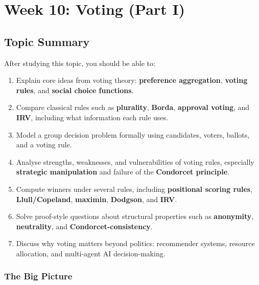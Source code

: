 \section{Week 10: Voting (Part I)}

\subsection{Topic Summary}

\begin{keybox}
After studying this topic, you should be able to:
\begin{enumerate}
  \item Explain core ideas from voting theory: \textbf{preference aggregation}, \textbf{voting rules}, and \textbf{social choice functions}.
  \item Compare classical rules such as \textbf{plurality}, \textbf{Borda}, \textbf{approval voting}, and \textbf{IRV}, including what information each rule uses.
  \item Model a group decision problem formally using candidates, voters, ballots, and a voting rule.
  \item Analyse strengths, weaknesses, and vulnerabilities of voting rules, especially \textbf{strategic manipulation} and failure of the \textbf{Condorcet principle}.
  \item Compute winners under several rules, including \textbf{positional scoring rules}, \textbf{Llull/Copeland}, \textbf{maximin}, \textbf{Dodgson}, and \textbf{IRV}.
  \item Solve proof-style questions about structural properties such as \textbf{anonymity}, \textbf{neutrality}, and \textbf{Condorcet-consistency}.
  \item Discuss why voting matters beyond politics: recommender systems, resource allocation, and multi-agent AI decision-making.
\end{enumerate}
\end{keybox}

\separator

\subsubsection*{The Big Picture}

